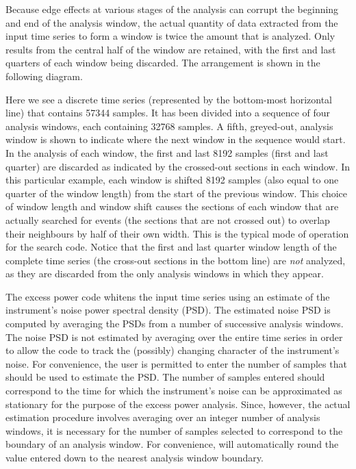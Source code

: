 Because edge effects at various stages of the analysis can corrupt the
beginning and end of the analysis window, the actual quantity of data
extracted from the input time series to form a window is twice the amount
that is analyzed.  Only results from the central half of the window are
retained, with the first and last quarters of each window being discarded.
The arrangement is shown in the following diagram.
\begin{center}

\end{center}
Here we see a discrete time series (represented by the bottom-most
horizontal line) that contains 57344 samples.  It has been divided into a
sequence of four analysis windows, each containing 32768 samples.  A fifth,
greyed-out, analysis window is shown to indicate where the next window in
the sequence would start.  In the analysis of each window, the first and
last 8192 samples (first and last quarter) are discarded as indicated by
the crossed-out sections in each window.  In this particular example, each
window is shifted 8192 samples (also equal to one quarter of the window
length) from the start of the previous window.  This choice of window
length and window shift causes the sections of each window that are
actually searched for events (the sections that are not crossed out) to
overlap their neighbours by half of their own width.  This is the typical
mode of operation for the search code.  Notice that the first and last
quarter window length of the complete time series (the cross-out sections
in the bottom line) are \emph{not} analyzed, as they are discarded from the
only analysis windows in which they appear.

The excess power code whitens the input time series using an estimate of
the instrument's noise power spectral density (PSD).  The estimated noise
PSD is computed by averaging the PSDs from a number of successive analysis
windows.  The noise PSD is not estimated by averaging over the entire time
series in order to allow the code to track the (possibly) changing
character of the instrument's noise.  For convenience, the user is
permitted to enter the number of samples that should be used to estimate
the PSD.  The number of samples entered should correspond to the time for
which the instrument's noise can be approximated as stationary for the
purpose of the excess power analysis.  Since, however, the actual
estimation procedure involves averaging over an integer number of analysis
windows, it is necessary for the number of samples selected to correspond
to the boundary of an analysis window.  For convenience,
 will automatically round the value entered down to
the nearest analysis window boundary.


